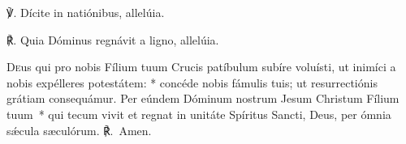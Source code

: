 ℣. Dícite in natiónibus, allelúia.

℟. Quia Dóminus regnávit a ligno, allelúia.


\lettrine{D}{e}us qui pro nobis Fílium tuum Crucis patíbulum subíre voluísti, ut inimíci a nobis expélleres potestátem: * concéde nobis fámulis tuis; ut resurrectiónis grátiam consequámur. Per eúndem Dóminum nostrum Jesum Christum Fílium tuum~* qui tecum vivit et regnat in unitáte Spíritus Sancti, Deus, per ómnia sǽcula sæculórum. ℟.~Amen.